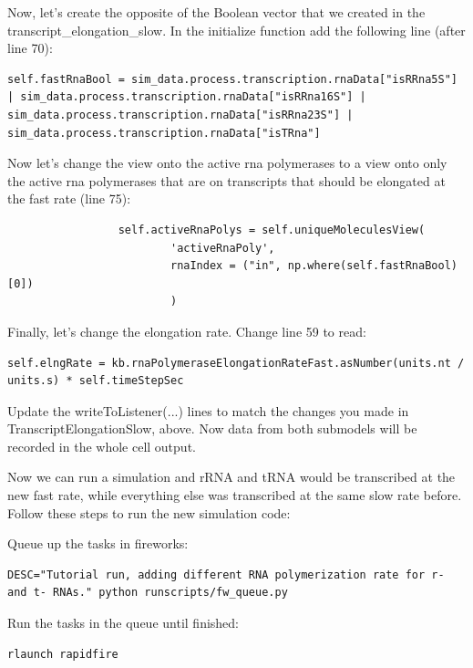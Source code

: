 \documentclass[12pt]{article}
\begin{document}
Now, let’s create the opposite of the Boolean vector that we created in the transcript\_elongation\_slow. In the initialize function add the following line (after line 70):

\lstset{language=Python}
\begin{lstlisting}
self.fastRnaBool = sim_data.process.transcription.rnaData["isRRna5S"] | sim_data.process.transcription.rnaData["isRRna16S"] | sim_data.process.transcription.rnaData["isRRna23S"] | sim_data.process.transcription.rnaData["isTRna"]
\end{lstlisting}

Now let’s change the view onto the active rna polymerases to a view onto only the active rna polymerases that are on transcripts that should be elongated at the fast rate (line 75):

\begin{lstlisting}
                 self.activeRnaPolys = self.uniqueMoleculesView(
                         'activeRnaPoly',
                         rnaIndex = ("in", np.where(self.fastRnaBool)[0])
                         )
\end{lstlisting}

Finally, let’s change the elongation rate. Change line 59 to read:

\begin{lstlisting}
self.elngRate = kb.rnaPolymeraseElongationRateFast.asNumber(units.nt / units.s) * self.timeStepSec
\end{lstlisting}

Update the writeToListener(...) lines to match the changes you made in TranscriptElongationSlow, above. Now data from both submodels will be recorded in the whole cell output.

\par
Now we can run a simulation and rRNA and tRNA would be transcribed at the new fast rate, while everything else was transcribed at the same slow rate before. Follow these steps to run the new simulation code:
\par
Queue up the tasks in fireworks:

\lstset{language=bash}
\begin{lstlisting}
DESC="Tutorial run, adding different RNA polymerization rate for r- and t- RNAs." python runscripts/fw_queue.py
\end{lstlisting}

Run the tasks in the queue until finished:

\begin{lstlisting}
rlaunch rapidfire
\end{lstlisting}
\end{document}
